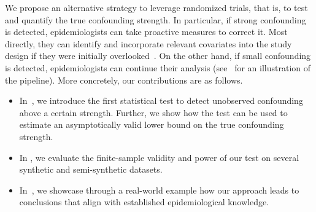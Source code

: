 We propose an alternative strategy to leverage randomized trials, that is, to test and quantify the true confounding strength. In particular, if strong confounding is detected, epidemiologists can take proactive measures to correct it. Most directly, they can identify and incorporate relevant covariates into the study design if they were initially overlooked~\citep{dreyer2018advancing}. On the other hand, if small confounding is detected, epidemiologists can continue their analysis (see~ for an illustration of the pipeline). More concretely, our contributions are as follows.
\begin{itemize}
\vspace{-2mm}
\item In~, we introduce the first statistical test to detect unobserved confounding above a certain strength. Further, we show how the test can be used to estimate an asymptotically valid lower bound on the true confounding strength.
\item In , we evaluate the finite-sample validity and power of our test on several synthetic and semi-synthetic datasets. 
\item In~,
we showcase through a real-world example how our approach leads to conclusions that align with established epidemiological knowledge.
\end{itemize}


